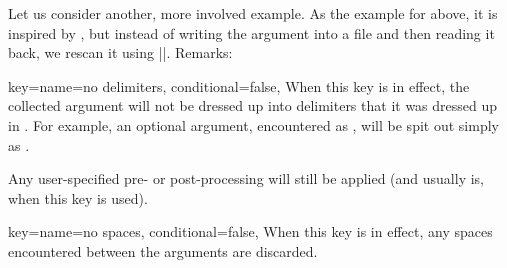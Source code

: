 \documentclass[a4paper,11pt]{article}
\begin{document}
\begin{doc}
  Let us consider another, more involved example.  As the example for
   above, it is inspired by ,
  but instead of writing the argument into a file and then reading it back, we
  rescan it using |\scantokens|.  Remarks:
  
\end{doc}

\begin{doc}[
    pi=\docaux{cmd}{ifcollargsNoDelimiters}
  ]{
    key={name=no delimiters, conditional=false},
  }
  When this key is in effect, the collected argument will not be dressed up
  into delimiters that it was dressed up in .  For
  example, an optional argument, encountered as , will
  be spit out simply as .

  Any user-specified pre- or post-processing will still be applied (and usually
  is, when this key is used).
  
\end{doc}

\begin{doc}[
    pi=\docaux{cmd}{ifcollargsNoSpaces}
  ]{
    key={name=no spaces, conditional=false},
  }
  When this key is in effect, any spaces encountered between the arguments are
  discarded.
\end{doc}
\end{document}
